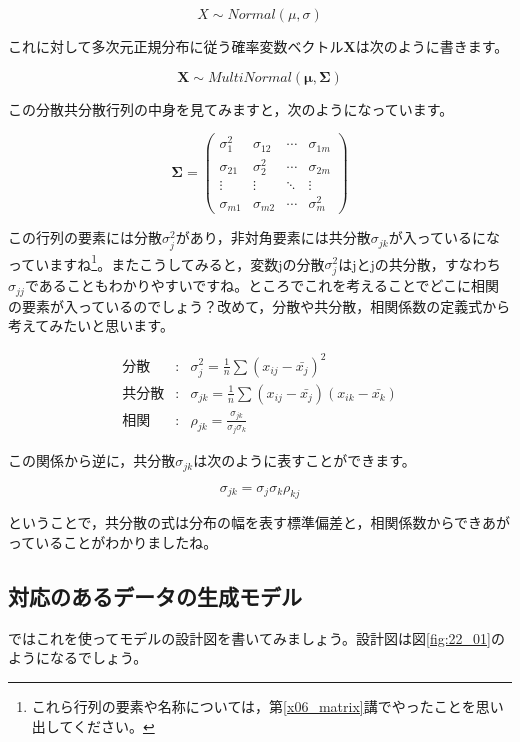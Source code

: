 \documentclass{ltjsbook}
\begin{document}
\[ X \sim Normal(\mu, \sigma) \]

これに対して多次元正規分布に従う確率変数ベクトル$\bm{X}$は次のように書きます。

\[ \bm{X} \sim MultiNormal(\bm{\mu}, \bm{\Sigma}) \]

この分散共分散行列の中身を見てみますと，次のようになっています。

\[ \bm{\Sigma} = \begin{pmatrix} \sigma_{1}^2 & \sigma_{12} & \cdots & \sigma_{1m}  \\
                \sigma_{21}  & \sigma_2^2  & \cdots & \sigma_{2m}  \\
                \vdots       & \vdots      & \ddots & \vdots       \\
                \sigma_{m1}  & \sigma_{m2} & \cdots & \sigma_{m}^2\end{pmatrix} \]

この行列の要素には分散$\sigma_j^2$があり，非対角要素には共分散$\sigma_{jk}$が入っているになっていますね\footnote{これら行列の要素や名称については，第\ref{x06_matrix}講でやったことを思い出してください。}。またこうしてみると，変数jの分散$\sigma_j^2$はjとjの共分散，すなわち$\sigma_{jj}$であることもわかりやすいですね。ところでこれを考えることでどこに相関の要素が入っているのでしょう？改めて，分散や共分散，相関係数の定義式から考えてみたいと思います。

\begin{eqnarray}
	\mbox{分散} &:& \sigma_{j}^2 = \frac{1}{n}\sum (x_{ij} -\bar{x_j})^2 \\
	\mbox{共分散} &:& \sigma_{jk} = \frac{1}{n}\sum (x_{ij} - \bar{x_j})(x_{ik} - \bar{x_k}) \\
	\mbox{相関} &:& \rho_{jk} = \frac{\sigma_{jk}}{\sigma_j\sigma_k}
\end{eqnarray}

この関係から逆に，共分散$\sigma_{jk}$は次のように表すことができます。

\[ \sigma_{jk} = \sigma_j \sigma_k \rho_{kj} \]

ということで，共分散の式は分布の幅を表す標準偏差と，相関係数からできあがっていることがわかりましたね。
\subsection{対応のあるデータの生成モデル}
ではこれを使ってモデルの設計図を書いてみましょう。設計図は図\ref{fig:22_01}のようになるでしょう。
\end{document}
